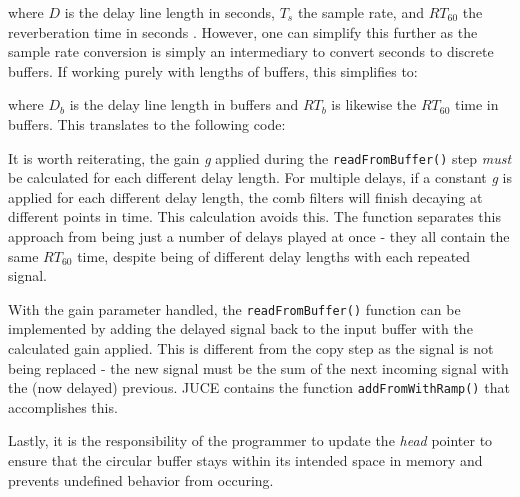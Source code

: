 \begin{center}
\end{center}

where $D$ is the delay line length in seconds, $T_s$ the sample rate, and $RT_{60}$ the reverberation time in seconds  \cite{pirkle2019designing}. However, one can simplify this further as the sample rate conversion is simply an intermediary to convert seconds to discrete buffers. If working purely with lengths of buffers, this simplifies to:

\begin{center}
\end{center}

where $D_b$ is the delay line length in buffers and $RT_b$ is likewise the $RT_{60}$ time in buffers. This translates to the following code:

\begin{singlespace}

\end{singlespace} \hfill \break
\hspace*{0.6cm}It is worth reiterating, the gain \textit{g} applied during the \verb|readFromBuffer()| step \textit{must} be calculated for each different delay length. For multiple delays, if a constant \textit{g} is applied for each different delay length, the comb filters will finish decaying at different points in time. This calculation avoids this. The function separates this approach from being just a number of delays played at once - they all contain the same $RT_{60}$ time, despite being of different delay lengths with each repeated signal.

With the gain parameter handled, the \verb|readFromBuffer()| function can be implemented by adding the delayed signal back to the input buffer with the calculated gain applied. This is different from the copy step as the signal is not being replaced - the new signal must be the sum of the next incoming signal with the (now delayed) previous. JUCE contains the function \verb|addFromWithRamp()| that accomplishes this.

\begin{singlespace}

\end{singlespace} \hfill \break
\hspace*{0.6cm}Lastly, it is the responsibility of the programmer to update the \textit{head} pointer to ensure that the circular buffer stays within its intended space in memory and prevents undefined behavior from occuring.

